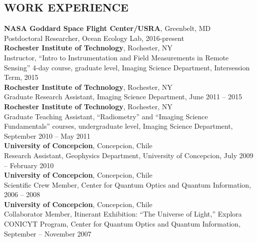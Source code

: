 \documentclass[11pt]{res} %
\begin{document}
\begin{resume}
\section{WORK EXPERIENCE}
\vspace{0.1in}
{\bf NASA Goddard Space Flight Center/USRA}, Greenbelt, MD\\
Postdoctoral Researcher, Ocean Ecology Lab, 2016-present
\vspace{0.1in}\\
{\bf Rochester Institute of Technology}, Rochester, NY\\
Instructor, ``Intro to Instrumentation and Field Measurements in Remote Sensing'' 4-day course, graduate level, Imaging Science Department, Intersession Term, 2015
\vspace{0.1in}\\
{\bf Rochester Institute of Technology}, Rochester, NY\\
Graduate Research Assistant, Imaging Science Department, June 2011 -- 2015
\vspace{0.1in}\\
{\bf Rochester Institute of Technology}, Rochester, NY\\
Graduate Teaching Assistant, ``Radiometry'' and  ``Imaging Science Fundamentals'' courses, undergraduate level, Imaging Science Department, September 2010 -- May 2011
\vspace{0.1in}\\
{\bf University of Concepcion}, Concepcion, Chile\\
Research Assistant, Geophysics Department, University of Concepcion, July 2009 -- February 2010
\vspace{-0.1in}\\
{\bf University of Concepcion}, Concepcion, Chile\\
Scientific Crew Member, Center for Quantum Optics and Quantum Information, 2006 -- 2008
\vspace{0.1in}\\
{\bf University of Concepcion}, Concepcion, Chile\\
Collaborator Member, Itinerant Exhibition: ``The Universe of Light,'' Explora CONICYT Program, Center for Quantum Optics and Quantum Information, September -- November 2007\\

\vspace{-0.2in}

\end{resume}
\end{document}
